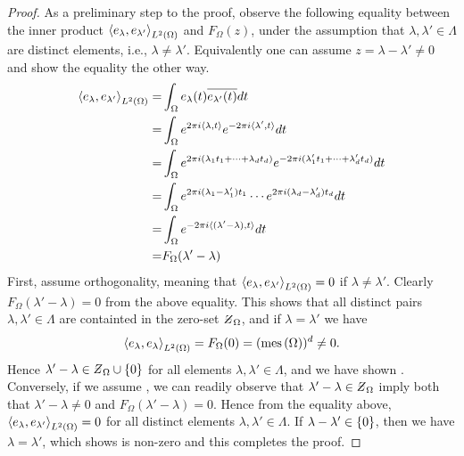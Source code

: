 \documentclass[../thesis.tex]{subfiles}
\begin{document}
\begin{proof}
    As a preliminary step to the proof, observe the following equality between the inner product $\left \langle e_{\lambda},e_{\lambda'}  \right \rangle_{L^2(\Omega)}$ and $F_{\Omega}(z)$, under the assumption that $\lambda,\lambda'\in \Lambda$ are distinct elements, i.e., $\lambda \neq \lambda'$. Equivalently one can assume $z = \lambda - \lambda' \neq0$ and show the equality the other way.  %
    \begin{align*}
        \left \langle e_{\lambda},e_{\lambda'}  \right \rangle_{L^2(\Omega)} =& \int_{\Omega} e_{\lambda}(t)\overline{e_{\lambda'}(t)} dt\\
        =& \int_{\Omega} e^{2\pi i \langle\lambda,t\rangle} e^{-2 \pi i \langle\lambda',t\rangle} dt\\
        =& \int_{\Omega} e^{2\pi i  (\lambda_1t_1 + \dots +\lambda_d t_d)} e^{-2\pi i  (\lambda_1' t_1 + \dots +\lambda_d' t_d)} dt\\
        =& \int_{\Omega} e^{2\pi i  (\lambda_1 -\lambda_1')t_1} \cdots e^{2\pi i  (\lambda_d -\lambda_d')t_d} dt\\
        =&\int_{\Omega} e^{-2 \pi i \langle(\lambda'-\lambda),t\rangle} dt\\
        =& F_{\Omega} (\lambda'-\lambda)
    \end{align*}
    First, assume orthogonality, meaning that $\left \langle e_{\lambda},e_{\lambda'}  \right \rangle_{L^2(\Omega)} = 0 $ if $\lambda \neq\lambda'$. Clearly $F_{\Omega}(\lambda'-\lambda) = 0$ from the above equality. This shows that all distinct pairs $\lambda,\lambda'\in\Lambda$ are containted in the zero-set $\Zstroke_{\Omega}$, and if $\lambda = \lambda'$ we have
    \begin{equation}\label{eq:connection_lamb_equal_lamb}
        \left \langle e_{\lambda},e_{\lambda}  \right \rangle_{L^2(\Omega)} = F_{\Omega}(0) = (\operatorname{mes}\left(\Omega\right))^d \neq 0.
    \end{equation}
    Hence $\lambda'-\lambda \in \Zstroke_{\Omega} \cup \braq{0}$ for all elements $\lambda,\lambda'\in \Lambda$, and we have shown . Conversely, if we assume , we can readily observe that $\lambda'-\lambda \in \Zstroke_{\Omega}$ imply both that $\lambda'-\lambda\neq 0$ and $F_{\Omega} (\lambda'-\lambda) = 0$. Hence from the equality above, $\left \langle e_{\lambda},e_{\lambda'}  \right \rangle_{L^2(\Omega)} = 0 $ for all distinct elements $\lambda,\lambda'\in \Lambda$. If $\lambda-\lambda'\in \{0\}$, then we have $\lambda=\lambda'$, which  shows is non-zero and this completes the proof.  %
\end{proof}
\end{document}
